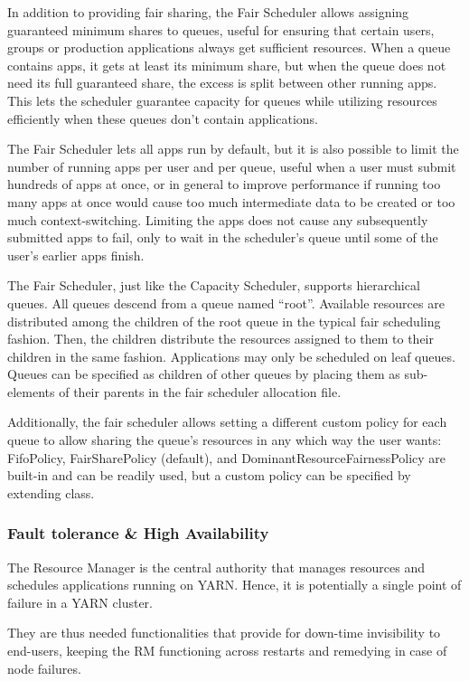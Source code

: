 In addition to providing fair sharing, the Fair Scheduler allows assigning guaranteed minimum shares to queues, useful for ensuring that certain users, groups or production applications always get sufficient resources. When a queue contains apps, it gets at least its minimum share, but when the queue does not need its full guaranteed share, the excess is split between other running apps. This lets the scheduler guarantee capacity for queues while utilizing resources efficiently when these queues don’t contain applications.

The Fair Scheduler lets all apps run by default, but it is also possible to limit the number of running apps per user and per queue, useful when a user must submit hundreds of apps at once, or in general to improve performance if running too many apps at once would cause too much intermediate data to be created or too much context-switching. Limiting the apps does not cause any subsequently submitted apps to fail, only to wait in the scheduler’s queue until some of the user’s earlier apps finish.

The Fair Scheduler, just like the Capacity Scheduler, supports hierarchical queues. All queues descend from a queue named “root”. Available resources are distributed among the children of the root queue in the typical fair scheduling fashion. Then, the children distribute the resources assigned to them to their children in the same fashion. Applications may only be scheduled on leaf queues. Queues can be specified as children of other queues by placing them as sub-elements of their parents in the fair scheduler allocation file.

Additionally, the fair scheduler allows setting a different custom policy for each queue to allow sharing the queue’s resources in any which way the user wants: FifoPolicy, FairSharePolicy (default), and DominantResourceFairnessPolicy are built-in and can be readily used, but a custom policy can be specified by extending \texttt{} class. 

\subsubsection{Fault tolerance \& High Availability}

The Resource Manager is the central authority that manages resources and schedules applications running on YARN. Hence, it is potentially a single point of failure in a YARN cluster. 

They are thus needed functionalities that provide for down-time invisibility to end-users, keeping the RM functioning across restarts and remedying in case of node failures.

